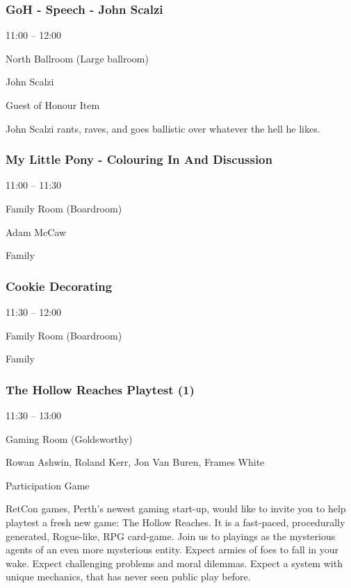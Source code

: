 \documentclass{scrreprt}
\begin{document}
\begin{multicols}{2}
\subsubsection*{GoH - Speech - John Scalzi}\begin{description}
\setlength{\itemsep}{0pt}
\setlength{\parsep}{0pt}
\setlength{\parskip}{0pt}
\item[Time:]{11:00 -- 12:00}
\item[Venue:]{North Ballroom (Large ballroom)}
\item[People:]{John Scalzi}
\item[Tags:]{Guest of Honour Item}\end{description}
John Scalzi rants, raves, and goes ballistic over whatever the hell he likes.
\subsubsection*{My Little Pony - Colouring In And Discussion}\begin{description}
\setlength{\itemsep}{0pt}
\setlength{\parsep}{0pt}
\setlength{\parskip}{0pt}
\item[Time:]{11:00 -- 11:30}
\item[Venue:]{Family Room (Boardroom)}
\item[People:]{Adam McCaw}
\item[Tags:]{Family}\end{description}

\subsubsection*{Cookie Decorating}\begin{description}
\setlength{\itemsep}{0pt}
\setlength{\parsep}{0pt}
\setlength{\parskip}{0pt}
\item[Time:]{11:30 -- 12:00}
\item[Venue:]{Family Room (Boardroom)}
\item[Tags:]{Family}\end{description}

\subsubsection*{The Hollow Reaches Playtest (1)}\begin{description}
\setlength{\itemsep}{0pt}
\setlength{\parsep}{0pt}
\setlength{\parskip}{0pt}
\item[Time:]{11:30 -- 13:00}
\item[Venue:]{Gaming Room (Goldsworthy)}
\item[People:]{Rowan Ashwin, Roland Kerr, Jon Van Buren, Frames White}
\item[Tags:]{Participation Game}\end{description}
RetCon games, Perth's newest gaming start-up, would like to invite you to help playtest a fresh new game: The Hollow Reaches. It is a fast-paced, procedurally generated, Rogue-like, RPG card-game. Join us to playings as the mysterious agents of an even more mysterious entity. Expect armies of foes to fall in your wake. Expect challenging problems and moral dilemmas. Expect a system with unique mechanics, that has never seen public play before.

\end{multicols}
\end{document}
